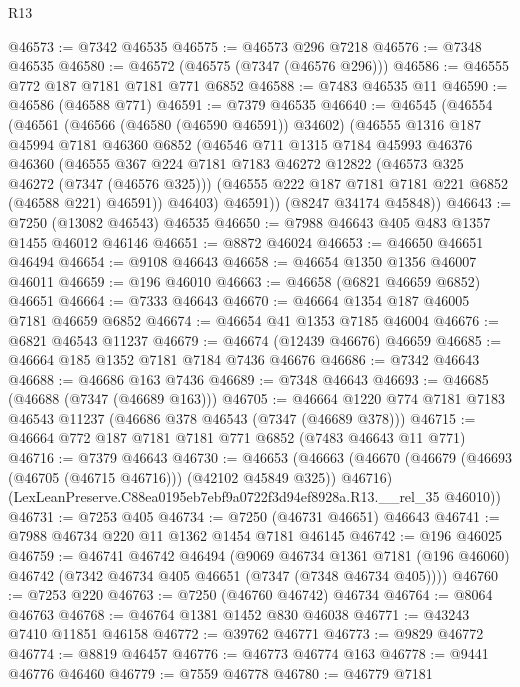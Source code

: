 \begin{lexlean}{R13}
\begin{coremodule}
@46573 := @7342 @46535
@46575 := @46573 @296 @7218
@46576 := @7348 @46535
@46580 := @46572 (@46575 (@7347 (@46576 @296)))
@46586 := @46555 @772 @187 @7181 @7181 @771 @6852
@46588 := @7483 @46535 @11
@46590 := @46586 (@46588 @771)
@46591 := @7379 @46535
@46640 := @46545
    (@46554
      (@46561
        (@46566 (@46580 (@46590 @46591)) @34602)
        (@46555
          @1316
          @187
          @45994
          @7181
          @46360
          @6852
          (@46546
            @711
            @1315
            @7184
            @45993
            @46376
            @46360
            (@46555
              @367
              @224
              @7181
              @7183
              @46272
              @12822
              (@46573 @325 @46272 (@7347 (@46576 @325)))
              (@46555 @222 @187 @7181 @7181 @221 @6852 (@46588 @221) @46591))
            @46403)
          @46591))
      (@8247 @34174 @45848))
@46643 := @7250 (@13082 @46543) @46535
@46650 := @7988 @46643 @405 @483 @1357 @1455 @46012 @46146
@46651 := @8872 @46024
@46653 := @46650 @46651 @46494
@46654 := @9108 @46643
@46658 := @46654 @1350 @1356 @46007 @46011
@46659 := @196 @46010
@46663 := @46658 (@6821 @46659 @6852) @46651
@46664 := @7333 @46643
@46670 := @46664 @1354 @187 @46005 @7181 @46659 @6852
@46674 := @46654 @41 @1353 @7185 @46004
@46676 := @6821 @46543 @11237
@46679 := @46674 (@12439 @46676) @46659
@46685 := @46664 @185 @1352 @7181 @7184 @7436 @46676
@46686 := @7342 @46643
@46688 := @46686 @163 @7436
@46689 := @7348 @46643
@46693 := @46685 (@46688 (@7347 (@46689 @163)))
@46705 := @46664 @1220 @774 @7181 @7183 @46543 @11237 (@46686 @378 @46543 (@7347 (@46689 @378)))
@46715 := @46664 @772 @187 @7181 @7181 @771 @6852 (@7483 @46643 @11 @771)
@46716 := @7379 @46643
@46730 := @46653
    (@46663
      (@46670 (@46679 (@46693 (@46705 (@46715 @46716))) (@42102 @45849 @325)) @46716)
      (LexLeanPreserve.C88ea0195eb7ebf9a0722f3d94ef8928a.R13.__rel_35 @46010))
@46731 := @7253 @405
@46734 := @7250 (@46731 @46651) @46643
@46741 := @7988 @46734 @220 @11 @1362 @1454 @7181 @46145
@46742 := @196 @46025
@46759 := @46741
    @46742
    @46494
    (@9069
      @46734
      @1361
      @7181
      (@196 @46060)
      @46742
      (@7342 @46734 @405 @46651 (@7347 (@7348 @46734 @405))))
@46760 := @7253 @220
@46763 := @7250 (@46760 @46742) @46734
@46764 := @8064 @46763
@46768 := @46764 @1381 @1452 @830 @46038
@46771 := @43243 @7410 @11851 @46158
@46772 := @39762 @46771
@46773 := @9829 @46772
@46774 := @8819 @46457
@46776 := @46773 @46774 @163
@46778 := @9441 @46776 @46460
@46779 := @7559 @46778
@46780 := @46779 @7181

\end{coremodule}
\end{lexlean}
